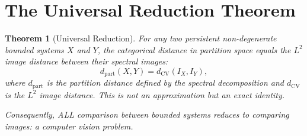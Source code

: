 \documentclass[11pt,twocolumn,a4paper]{article}
\newtheorem{theorem}{Theorem}[section]
\begin{document}
\section{The Universal Reduction Theorem}
\label{sec:universal_reduction}

\begin{theorem}[Universal Reduction]
\label{thm:universal_reduction}
For any two persistent non-degenerate bounded systems $X$ and $Y$,
the categorical distance in partition space equals the $L^2$ image
distance between their spectral images:
\begin{equation}
\label{eq:universal_reduction}
  d_{\mathrm{part}}(X, Y) = d_{\mathrm{CV}}(I_X, I_Y),
\end{equation}
where $d_{\mathrm{part}}$ is the partition distance defined by the
spectral decomposition and $d_{\mathrm{CV}}$ is the $L^2$ image
distance. This is not an approximation but an exact identity.

Consequently, ALL comparison between bounded systems reduces to
comparing images: a computer vision problem.
\end{theorem}
\end{document}
